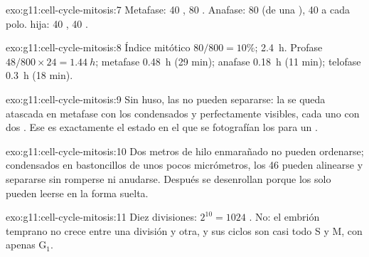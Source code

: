 \begin{solution}{exo:g11:cell-cycle-mitosis:7}
Metafase: 40 , 80 . Anafase: 80  (de una
), 40 a cada polo.  hija: 40 , 40 .
\end{solution}

\begin{solution}{exo:g11:cell-cycle-mitosis:8}
Índice mitótico $80/800 = 10\%$;  \qty{2.4}{h}. Profase
$48/800 \times 24 = \qty{1.44}{h}$; metafase \qty{0.48}{h} (29 min);
anafase \qty{0.18}{h} (11 min); telofase \qty{0.3}{h} (18 min).
\end{solution}

\begin{solution}{exo:g11:cell-cycle-mitosis:9}
Sin huso, las  no pueden separarse: la  se queda
atascada en metafase con los  condensados y perfectamente
visibles, cada uno con dos . Ese es exactamente el estado en
el que se fotografían los  para un .
\end{solution}

\begin{solution}{exo:g11:cell-cycle-mitosis:10}
Dos metros de hilo enmarañado no pueden ordenarse; condensados en
bastoncillos de unos pocos micrómetros, los 46  pueden
alinearse y separarse sin romperse ni anudarse. Después se desenrollan
porque los  solo pueden leerse en la forma suelta.
\end{solution}

\begin{solution}{exo:g11:cell-cycle-mitosis:11}
Diez divisiones: $2^{10} = 1024$ . No: el embrión temprano no
crece entre una división y otra, y sus ciclos son casi todo S y M, con
apenas $\mathrm{G_1}$.
\end{solution}

